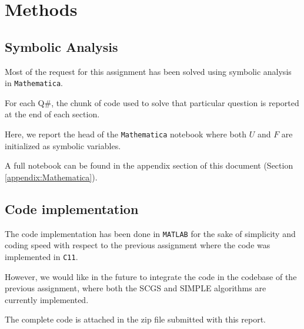 \section{Methods}
\label{sec:methods}

\subsection{Symbolic Analysis}

Most of the request for this assignment has been solved using symbolic analysis in \texttt{Mathematica}.

For each Q\#, the chunk of code used to solve that particular question is reported at the end of each section.

Here, we report the head of the \texttt{Mathematica} notebook where both $U$ and $F$ are initialized as symbolic variables.



A full notebook can be found in the appendix section of this document (Section \ref{appendix:Mathematica}).

\subsection{Code implementation}

The code implementation has been done in \texttt{MATLAB} for the sake of simplicity and coding speed with respect to the previous assignment where the code was implemented in \texttt{C11}.

However, we would like in the future to integrate the code in the codebase of the previous assignment, where both the SCGS and SIMPLE algorithms are currently implemented.

The complete code is attached in the zip file submitted with this report.